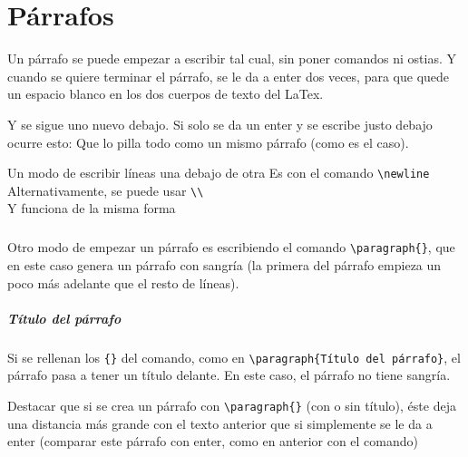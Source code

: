 \chapter{Párrafos}

Un párrafo se puede empezar a escribir tal cual, sin poner comandos ni ostias. Y cuando se quiere terminar el párrafo, se le da a enter dos veces, para que quede un espacio blanco en los dos cuerpos de texto del LaTex.

Y se sigue uno nuevo debajo.
Si solo se da un enter y se escribe justo debajo ocurre esto:
Que lo pilla todo como un mismo párrafo (como es el caso).

Un modo de escribir líneas una debajo de otra \newline
Es con el comando \verb!\newline! \newline
Alternativamente, se puede usar \verb!\\! \\
Y funciona de la misma forma

\paragraph{}Otro modo de empezar un párrafo es escribiendo el comando \verb!\paragraph{}!, que en este caso genera un párrafo con sangría (la primera del párrafo empieza un poco más adelante que el resto de líneas).

\paragraph{Título del párrafo}Si se rellenan los \verb!{}! del comando, como en \verb!\paragraph{Título del párrafo}!, el párrafo pasa a tener un título delante. En este caso, el párrafo no tiene sangría.

Destacar que si se crea un párrafo con \verb!\paragraph{}! (con o sin título), éste deja una distancia más grande con el texto anterior que si simplemente se le da a enter (comparar este párrafo con enter, como en anterior con el comando)